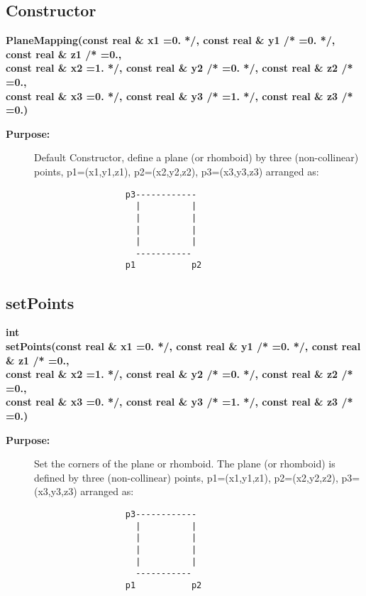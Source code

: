 \subsection{Constructor}
 
\newlength{\PlaneMappingIncludeArgIndent}
\begin{flushleft} \textbf{%
\settowidth{\PlaneMappingIncludeArgIndent}{PlaneMapping(}%
PlaneMapping(const real \& x1  =0. */, const real \& y1 /* =0. */, const real \& z1 /* =0.,\\ 
\hspace{\PlaneMappingIncludeArgIndent}const real \& x2  =1. */, const real \& y2 /* =0. */, const real \& z2 /* =0.,\\ 
\hspace{\PlaneMappingIncludeArgIndent}const real \& x3  =0. */, const real \& y3 /* =1. */, const real \& z3 /* =0.)
}\end{flushleft}
\begin{description}
\item[{\bf Purpose:}]  Default Constructor, define a plane (or rhomboid) by three
   (non-collinear) points, p1=(x1,y1,z1), p2=(x2,y2,z2), p3=(x3,y3,z3)
  arranged as:
 \begin{verbatim}
                  p3------------
                    |          |
                    |          |
                    |          |
                    |          |
                    -----------
                  p1           p2

 \end{verbatim}
\end{description}
\subsection{setPoints}
 
\begin{flushleft} \textbf{%
int  \\ 
\settowidth{\PlaneMappingIncludeArgIndent}{setPoints(}%
setPoints(const real \& x1  =0. */, const real \& y1 /* =0. */, const real \& z1 /* =0.,\\ 
\hspace{\PlaneMappingIncludeArgIndent}const real \& x2  =1. */, const real \& y2 /* =0. */, const real \& z2 /* =0.,\\ 
\hspace{\PlaneMappingIncludeArgIndent}const real \& x3  =0. */, const real \& y3 /* =1. */, const real \& z3 /* =0.)
}\end{flushleft}
\begin{description}
\item[{\bf Purpose:}]  Set the corners of the plane or rhomboid. The plane (or rhomboid) 
  is defined by three
   (non-collinear) points, p1=(x1,y1,z1), p2=(x2,y2,z2), p3=(x3,y3,z3)
  arranged as:
 \begin{verbatim}
                  p3------------
                    |          |
                    |          |
                    |          |
                    |          |
                    -----------
                  p1           p2

 \end{verbatim}
\end{description}
